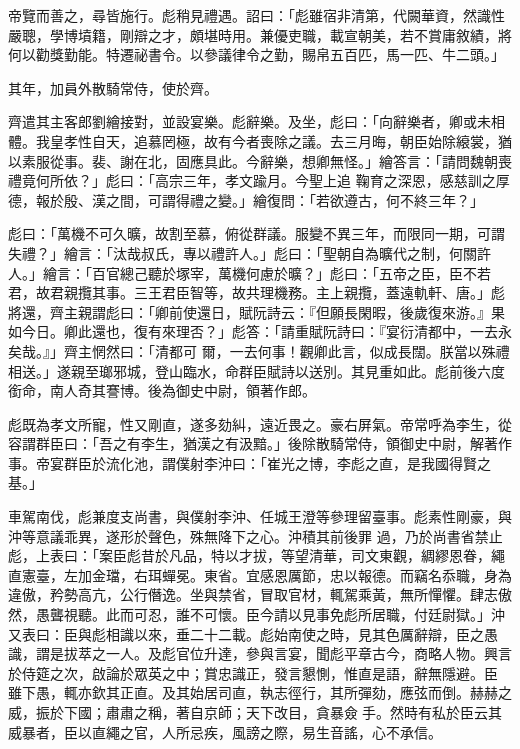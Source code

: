 \begin{pinyinscope}
 帝覽而善之，尋皆施行。彪稍見禮遇。詔曰：「彪雖宿非清第，代闕華資，然識性嚴聰，學博墳籍，剛辯之才，頗堪時用。兼優吏職，載宣朝美，若不賞庸敘績，將何以勸獎勤能。特遷祕書令。以參議律令之勤，賜帛五百匹，馬一匹、牛二頭。」



 其年，加員外散騎常侍，使於齊。



 齊遣其主客郎劉繪接對，並設宴樂。彪辭樂。及坐，彪曰：「向辭樂者，卿或未相體。我皇孝性自天，追慕罔極，故有今者喪除之議。去三月晦，朝臣始除縗裳，猶以素服從事。裴、謝在北，固應具此。今辭樂，想卿無怪。」繪答言：「請問魏朝喪禮竟何所依？」彪曰：「高宗三年，孝文踰月。今聖上追
 鞠育之深恩，感慈訓之厚德，報於殷、漢之間，可謂得禮之變。」繪復問：「若欲遵古，何不終三年？」



 彪曰：「萬機不可久曠，故割至慕，俯從群議。服變不異三年，而限同一期，可謂失禮？」繪言：「汰哉叔氏，專以禮許人。」彪曰：「聖朝自為曠代之制，何關許人。」繪言：「百官總己聽於塚宰，萬機何慮於曠？」彪曰：「五帝之臣，臣不若君，故君親攬其事。三王君臣智等，故共理機務。主上親攬，蓋遠軌軒、唐。」彪將還，齊主親謂彪曰：「卿前使還日，賦阮詩云：『但願長閑暇，後歲復來游。』果如今日。卿此還也，復有來理否？」彪答：「請重賦阮詩曰：『宴衍清都中，一去永矣哉。』」齊主惘然曰：「清都可
 爾，一去何事！觀卿此言，似成長闊。朕當以殊禮相送。」遂親至瑯邪城，登山臨水，命群臣賦詩以送別。其見重如此。彪前後六度銜命，南人奇其謇博。後為御史中尉，領著作郎。



 彪既為孝文所寵，性又剛直，遂多劾糾，遠近畏之。豪右屏氣。帝常呼為李生，從容謂群臣曰：「吾之有李生，猶漢之有汲黯。」後除散騎常侍，領御史中尉，解著作事。帝宴群臣於流化池，謂僕射李沖曰：「崔光之博，李彪之直，是我國得賢之基。」



 車駕南伐，彪兼度支尚書，與僕射李沖、任城王澄等參理留臺事。彪素性剛豪，與沖等意議乖異，遂形於聲色，殊無降下之心。沖積其前後罪
 過，乃於尚書省禁止彪，上表曰：「案臣彪昔於凡品，特以才拔，等望清華，司文東觀，綢繆恩眷，繩直憲臺，左加金璫，右珥蟬冕。東省。宜感恩厲節，忠以報德。而竊名忝職，身為違傲，矜勢高亢，公行僭逸。坐與禁省，冒取官材，輒駕乘黃，無所憚懼。肆志傲然，愚聾視聽。此而可忍，誰不可懷。臣今請以見事免彪所居職，付廷尉獄。」沖又表曰：臣與彪相識以來，垂二十二載。彪始南使之時，見其色厲辭辯，臣之愚識，謂是拔萃之一人。及彪官位升達，參與言宴，聞彪平章古今，商略人物。興言於侍筵之次，啟論於眾英之中；賞忠識正，發言懇惻，惟直是語，辭無隱避。臣
 雖下愚，輒亦欽其正直。及其始居司直，執志徑行，其所彈劾，應弦而倒。赫赫之威，振於下國；肅肅之稱，著自京師；天下改目，貪暴僉手。然時有私於臣云其威暴者，臣以直繩之官，人所忌疾，風謗之際，易生音謠，心不承信。




\end{pinyinscope}
